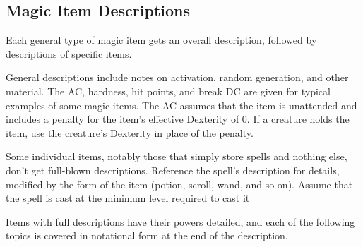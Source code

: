 \subsection{Magic Item Descriptions}

Each general type of magic item gets an overall description, followed by descriptions of specific items.

General descriptions include notes on activation, random generation, and other material. The AC, hardness, hit points, and break DC are given for typical examples of some magic items. The AC assumes that the item is unattended and includes a  penalty for the item's effective Dexterity of 0. If a creature holds the item, use the creature's Dexterity in place of the  penalty.

Some individual items, notably those that simply store spells and nothing else, don't get full-blown descriptions. Reference the spell's description for details, modified by the form of the item (potion, scroll, wand, and so on). Assume that the spell is cast at the minimum level required to cast it

Items with full descriptions have their powers detailed, and each of the following topics is covered in notational form at the end of the description.

